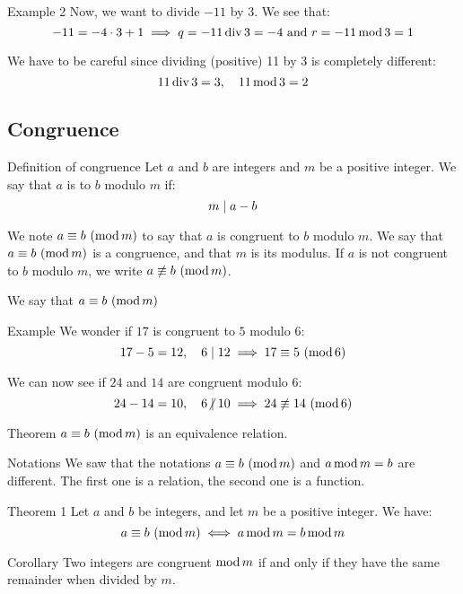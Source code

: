 \documentclass[a4paper]{article}
\begin{document}
\begin{parag}{Example 2}
    Now, we want to divide $-11$ by 3. We see that: 
    \[-11 = -4\cdot 3 + 1 \implies q = -11 \operatorname{div} 3 = -4 \text{ and } r = -11 \operatorname{mod} 3 = 1\]
    
    We have to be careful since dividing (positive) 11 by 3 is completely different: 
    \[11 \operatorname{div} 3 = 3, \quad 11 \operatorname{mod} 3 = 2\]
\end{parag}

\subsection{Congruence}
\begin{parag}{Definition of congruence}
    Let $a$ and $b$ are integers and $m$ be a positive integer. We say that $a$ is  to $b$ modulo $m$ if:
    \[m \mid a - b\]
    
    We note $a \equiv b\ (\operatorname{mod} m)$ to say that $a$ is congruent to $b$ modulo $m$. We say that $a \equiv b\ (\operatorname{mod} m)$ is a congruence, and that $m$ is its modulus. If $a$ is not congruent to $b$ modulo $m$, we write $a \not\equiv b\ (\operatorname{mod} m)$.

    We say that $a \equiv b\ (\operatorname{mod} m)$
\end{parag}

\begin{parag}{Example}
    We wonder if $17$ is congruent to $5$ modulo 6:  
    \[17 -5 = 12, \quad 6 \mid 12 \implies 17 \equiv 5\ (\operatorname{mod} 6)\]
    
    We can now see if $24$ and $14$ are congruent modulo 6: 
    \[24 - 14 = 10, \mathspace 6 \ndivides 10 \implies \notcongruent{24}{14}{6}\]
\end{parag}

\begin{parag}{Theorem}
    $a \equiv b\ (\operatorname{mod} m)$ is an equivalence relation.
\end{parag}


\begin{parag}{Notations}
    We saw that the notations $a \equiv b\ (\operatorname{mod} m)$ and $a \operatorname{mod} m = b$ are different. The first one is a relation, the second one is a function. 
\end{parag}

\begin{parag}{Theorem 1}
    Let $a$ and $b$ be integers, and let $m$ be a positive integer. We have:
    \[a \equiv b\ (\operatorname{mod} m) \iff a \operatorname{mod} m = b \operatorname{mod} m\]

    \begin{subparag}{Corollary}
        Two integers are congruent $\operatorname{mod} m$ if and only if they have the same remainder when divided by $m$.
    \end{subparag}
    

\end{parag}
\end{document}
